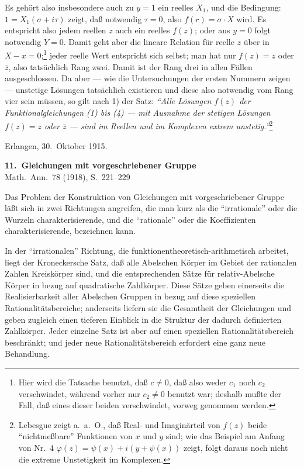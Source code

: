 \documentclass[12pt,a4paper]{article}
\begin{document}
Es geh\"ort also insbesondere auch zu $y = 1$ ein reelles $X_1$, und die Bedingung: $1 = X_1(\sigma + i\tau)$ zeigt, da\ss{} notwendig $\tau = 0$, also $f(r) = \sigma \cdot X$ wird. Es entspricht also jedem reellen $z$ auch ein reelles $f(z)$; oder aus $y = 0$ folgt notwendig $Y = 0$. Damit geht aber die lineare Relation f\"ur reelle $z$ \"uber in $X - x = 0$;\footnote{Hier wird die Tatsache benutzt, da\ss{} $c \neq 0$, da\ss{} also weder $c_1$ noch $c_2$ verschwindet, w\"ahrend vorher nur $c_2 \neq 0$ benutzt war; deshalb mu\ss te der Fall, da\ss{} eines dieser beiden verschwindet, vorweg genommen werden.} jeder reelle Wert entspricht sich selbst; man hat nur $f(z) = z$ oder $\bar{z}$, also tats\"achlich Rang zwei. Damit ist der Rang drei in allen F\"allen ausgeschlossen. Da aber --- wie die Untersuchungen der ersten Nummern zeigen --- unstetige L\"osungen tats\"achlich existieren und diese also notwendig vom Rang vier sein m\"ussen, so gilt nach 1) der Satz: \emph{``Alle L\"osungen $f(z)$ der Funktionalgleichungen (1) bis (4) --- mit Ausnahme der stetigen L\"osungen $f(z) = z$ oder $\bar{z}$ --- sind im Reellen und im Komplexen extrem unstetig.''}\footnote{Lebesgue zeigt a.\ a.\ O., da\ss{} Real- und Imagin\"arteil von $f(z)$ beide ``nichtme\ss bare'' Funktionen von $x$ und $y$ sind; wie das Beispiel am Anfang von Nr.\ 4 $\varphi(z) = \psi(x) + i(y + \psi(x))$ zeigt, folgt daraus noch nicht die extreme Unstetigkeit im Komplexen.}

\vspace{2em}
\begin{flushright}
Erlangen, 30.\ Oktober 1915.
\end{flushright}

\newpage
\begin{center}
\textbf{11.\ Gleichungen mit vorgeschriebener Gruppe}\\[0.5em]
\small Math.\ Ann.\ 78 (1918), S.~221--229
\end{center}

\vspace{1em}

Das Problem der Konstruktion von Gleichungen mit vorgeschriebener Gruppe l\"a\ss t sich in zwei Richtungen angreifen, die man kurz als die ``irrationale'' oder die Wurzeln charakterisierende, und die ``rationale'' oder die Koeffizienten charakterisierende, bezeichnen kann.

In der ``irrationalen'' Richtung, die funktionentheoretisch-arithmetisch arbeitet, liegt der Kroneckersche Satz, da\ss{} alle Abelschen K\"orper im Gebiet der rationalen Zahlen Kreisk\"orper sind, und die entsprechenden S\"atze f\"ur relativ-Abelsche K\"orper in bezug auf quadratische Zahlk\"orper. Diese S\"atze geben einerseits die Realisierbarkeit aller Abelschen Gruppen in bezug auf diese speziellen Rationalit\"atsbereiche; anderseits liefern sie die Gesamtheit der Gleichungen und geben zugleich einen tieferen Einblick in die Struktur der dadurch definierten Zahlk\"orper. Jeder einzelne Satz ist aber auf einen speziellen Rationalit\"atsbereich beschr\"ankt; und jeder neue Rationalit\"atsbereich erfordert eine ganz neue Behandlung.
\end{document}
